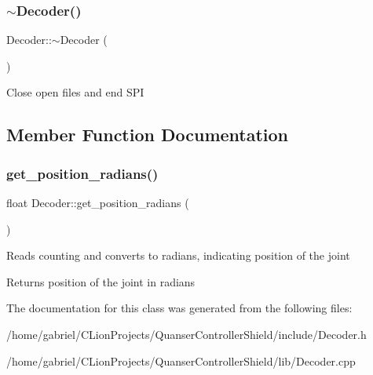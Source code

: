 \subsubsection{\texorpdfstring{$\sim$\+Decoder()}{~Decoder()}}
{\footnotesize\ttfamily Decoder\+::$\sim$\+Decoder (\begin{DoxyParamCaption}{ }\end{DoxyParamCaption})\hspace{0.3cm}{\ttfamily [virtual]}}

Close open files and end S\+PI 

\subsection{Member Function Documentation}
\mbox{\label{classDecoder_a27b38533ded3df3b1d81011105d0ae73}} 
\subsubsection{\texorpdfstring{get\+\_\+position\+\_\+radians()}{get\_position\_radians()}}
{\footnotesize\ttfamily float Decoder\+::get\+\_\+position\+\_\+radians (\begin{DoxyParamCaption}{ }\end{DoxyParamCaption})}

Reads counting and converts to radians, indicating position of the joint \begin{DoxyReturn}{Returns}
position of the joint in radians 
\end{DoxyReturn}


The documentation for this class was generated from the following files\+:\begin{DoxyCompactItemize}
\item 
/home/gabriel/\+C\+Lion\+Projects/\+Quanser\+Controller\+Shield/include/Decoder.\+h\item 
/home/gabriel/\+C\+Lion\+Projects/\+Quanser\+Controller\+Shield/lib/Decoder.\+cpp\end{DoxyCompactItemize}
